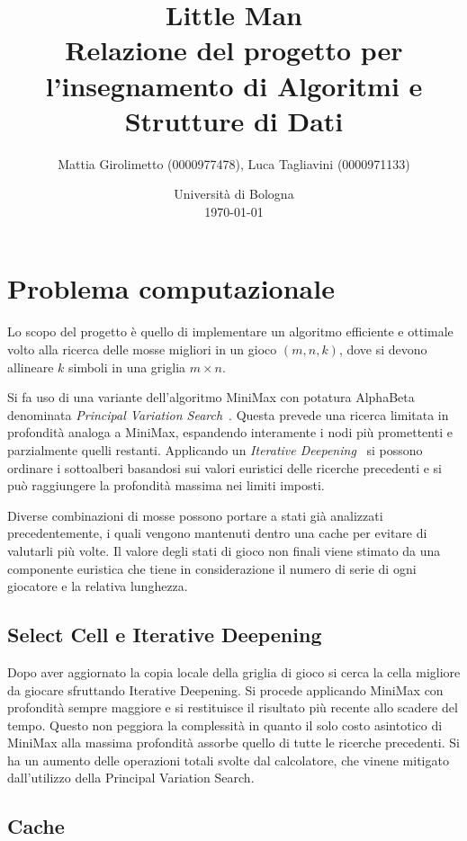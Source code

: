 \documentclass{article}
\title{Little Man\\
\large Relazione del progetto per l'insegnamento di Algoritmi e Strutture di Dati}
\author{
  Mattia Girolimetto (0000977478),
  Luca Tagliavini (0000971133)
}
\date{
	Universit\`a di Bologna \\
  \today
}
\begin{document}
\maketitle

\section*{Problema computazionale}

Lo scopo del progetto \`e quello di implementare un algoritmo efficiente e ottimale
volto alla ricerca delle mosse migliori in un gioco $(m,n,k)$, dove si devono
allineare $k$ simboli in una griglia $m \times n$.

Si fa uso di una variante dell'algoritmo MiniMax con potatura
AlphaBeta denominata \emph{Principal Variation Search}~\cite{negascout}. Questa
prevede  una ricerca limitata in profondit\`a analoga a MiniMax, espandendo 
interamente i nodi pi\`u promettenti e parzialmente quelli restanti. Applicando
un \emph{Iterative Deepening}~\cite{id} si possono ordinare i sottoalberi
basandosi sui valori euristici delle ricerche precedenti e si pu\`o raggiungere
la profondit\`a massima nei limiti imposti.

Diverse combinazioni di mosse possono portare a stati gi\`a analizzati
precedentemente, i quali vengono mantenuti dentro una cache per evitare di
valutarli pi\`u volte. Il valore degli stati di gioco non finali viene stimato
da una componente euristica che tiene in considerazione il numero di serie di
ogni giocatore e la relativa lunghezza.

\subsection*{Select Cell e Iterative Deepening}

Dopo aver aggiornato la copia locale della griglia di gioco si cerca la cella
migliore da giocare sfruttando Iterative Deepening. Si procede applicando
MiniMax con profondit\`a sempre maggiore e si restituisce il risultato pi\`u
recente allo scadere del tempo. Questo non peggiora la complessit\`a in quanto
il solo costo asintotico di MiniMax alla massima profondit\`a assorbe quello
di tutte le ricerche precedenti. Si ha un aumento delle operazioni totali svolte
dal calcolatore, che vinene mitigato dall'utilizzo della Principal Variation Search.

\subsection*{Cache}
\end{document}
